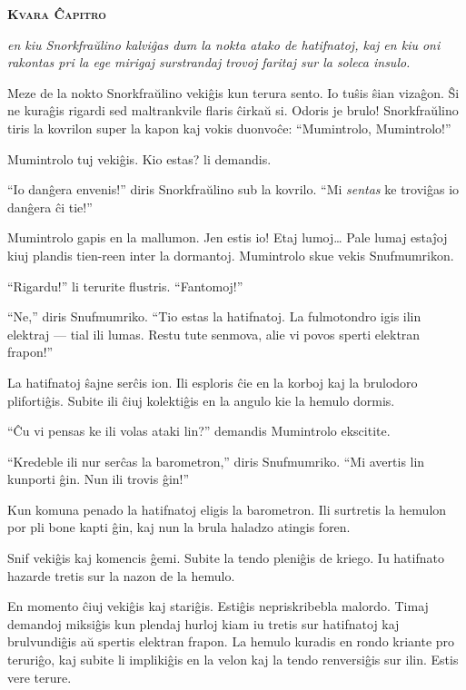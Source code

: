 \begin{center}\textbf{\Large\color{ForestGreen}\textsc{Kvara Ĉapitro}}\end{center}

\noindent\textit{en kiu Snorkfraŭlino kalviĝas dum la nokta atako de hatifnatoj, kaj en kiu oni rakontas pri la ege mirigaj surstrandaj trovoj faritaj sur la soleca insulo.}
\hfill \break
\hypertarget{Kvara Ĉapitro}{}
\label{Kvara Ĉapitro}


\noindent Meze de la nokto Snorkfraŭlino vekiĝis kun terura sento. Io tuŝis ŝian vizaĝon. Ŝi ne kuraĝis rigardi sed maltrankvile flaris ĉirkaŭ si. Odoris je brulo! Snorkfraŭlino tiris la kovrilon super la kapon kaj vokis duonvoĉe: ``Mumintrolo, Mumintrolo!''

Mumintrolo tuj vekiĝis. Kio estas? li demandis.

``Io danĝera envenis!'' diris Snorkfraŭlino sub la kovrilo. ``Mi \emph{sentas} ke troviĝas io danĝera ĉi tie!''

Mumintrolo gapis en la mallumon. Jen estis io! Etaj lumoj{\ldots} Pale lumaj estaĵoj kiuj plandis tien-reen inter la dormantoj. Mumintrolo skue vekis Snufmumrikon.

``Rigardu!'' li terurite flustris. ``Fantomoj!''

``Ne,'' diris Snufmumriko. ``Tio estas la hatifnatoj. La fulmotondro igis ilin elektraj --- tial ili lumas. Restu tute senmova, alie vi povos sperti elektran frapon!''

La hatifnatoj ŝajne serĉis ion. Ili esploris ĉie en la korboj kaj la brulodoro plifortiĝis. Subite ili ĉiuj kolektiĝis en la angulo kie la hemulo dormis.

``Ĉu vi pensas ke ili volas ataki lin?'' demandis Mumintrolo ekscitite.

``Kredeble ili nur serĉas la barometron,'' diris Snufmumriko. ``Mi avertis lin kunporti ĝin. Nun ili trovis ĝin!''

Kun komuna penado la hatifnatoj eligis la barometron. Ili surtretis la hemulon por pli bone kapti ĝin, kaj nun la brula haladzo atingis foren.

Snif vekiĝis kaj komencis ĝemi. Subite la tendo pleniĝis de kriego. Iu hatifnato hazarde tretis sur la nazon de la hemulo.

En momento ĉiuj vekiĝis kaj stariĝis. Estiĝis nepriskribebla malordo. Timaj demandoj miksiĝis kun plendaj hurloj kiam iu tretis sur hatifnatoj kaj brulvundiĝis aŭ spertis elektran frapon. La hemulo kuradis en rondo kriante pro teruriĝo, kaj subite li implikiĝis en la velon kaj la tendo renversiĝis sur ilin. Estis vere terure.

